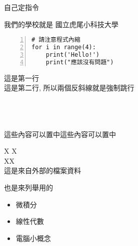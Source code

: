 \documentclass[twocolumn]{article}
\begin{document}
自己定指令

\newcommand{\nfu}{國立虎尾小科技大學}

我們的學校就是 \nfu

\begin{Verbatim}[frame=single, numbers=left]
# 請注意程式內縮
for i in range(4):
    print('Hello!')
    print("應該沒有問題")
\end{Verbatim}
這是第一行\\
這是第二行, 所以兩個反斜線就是強制跳行\\
\\
\\
\\
{\centering
這些內容可以置中這些內容可以置中%

}

X  X\\
X\enspace  X\\
這是來自外部的檔案資料

也是來列舉用的

\begin{itemize}
\item 微積分
\item 線性代數
\item 電腦小概念
\end{itemize}
\end{document}
